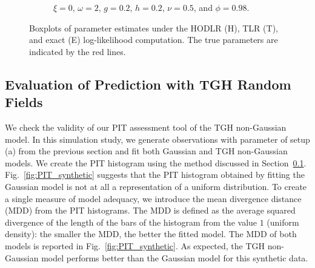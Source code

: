 \documentclass[conference]{IEEEtran}
\begin{document}
\begin{figure}[htp!]
\begin{subfigure}{0.44\textwidth}
  \caption{  $\xi = 0$, $\omega = 2$, $g = 0.2$, $h = 0.2$, $\nu = 0.5$, and $\phi = 0.98$.}
\end{subfigure}%
\caption{Boxplots of parameter estimates under the HODLR (H), TLR (T), and exact (E) log-likelihood computation. The true parameters are indicated by the red lines.}
\label{fig:boxplot}
\end{figure}

\subsection{Evaluation of Prediction with TGH Random Fields}
\label{sec:pit}
We check the validity of our PIT assessment tool of the TGH non-Gaussian model. In this simulation study, we generate observations with parameter of setup (a) from the previous section and fit both Gaussian and TGH non-Gaussian models. We create the PIT histogram using the method discussed in Section~\ref{sec:pit}. Fig.~\ref{fig:PIT_synthetic} suggests that the PIT histogram obtained by fitting the Gaussian model is not at all a representation of a uniform distribution. To create a single measure of model adequacy, we introduce the mean divergence distance (MDD) from the PIT histograms. The MDD is defined as the average squared divergence of the length of the bars of the histogram from the value $1$ (uniform density): the smaller the MDD, the better the fitted model. The MDD of both models is reported in Fig.~\ref{fig:PIT_synthetic}. As expected, the TGH non-Gaussian model performs better than the Gaussian model for this synthetic data.
\end{document}
